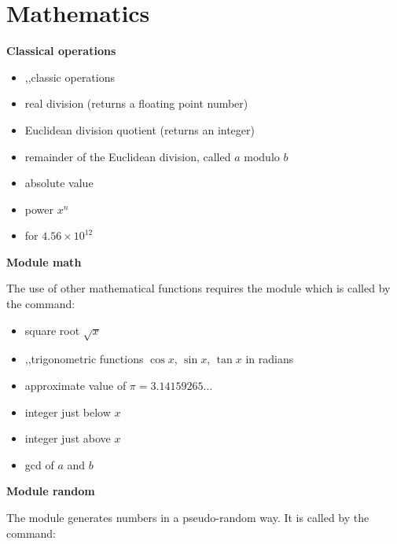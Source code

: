 \documentclass[11pt,class=report,crop=false]{standalone}
\begin{document}


\section{Mathematics}

\textbf{Classical operations}
\begin{itemize}
  \item {},\quad{},\quad{}\quad classic operations
  \item {}\quad \og{}real\fg{} division (returns a floating point number)
  \item {}\quad Euclidean division quotient (returns an integer)
  \item {}\quad remainder of the Euclidean division, called $a$ modulo $b$
  \item {}\quad absolute value
  \item {}\quad power $x^n$
  \item {}\quad for $4.56 \times 10^{12}$
\end{itemize}

\bigskip

\textbf{Module \og{}math\fg{}}

The use of other mathematical functions requires the module  which is called by the command:

\begin{itemize}
  \item {}\quad square root $\sqrt{x}$
  \item {},\quad{},\quad{}\quad trigonometric functions $\cos x$, $\sin x$, $\tan x$ in radians
  \item {}\quad approximate value of $\pi = 3.14159265\ldots$
  \item {}\quad integer just below $x$
  \item {}\quad integer just above $x$
  \item {}\quad gcd of $a$ and $b$
 \end{itemize}
 \bigskip

\textbf{Module \og{}random\fg{}}

The  module generates numbers in a pseudo-random way. It is called by the command:
\end{document}
